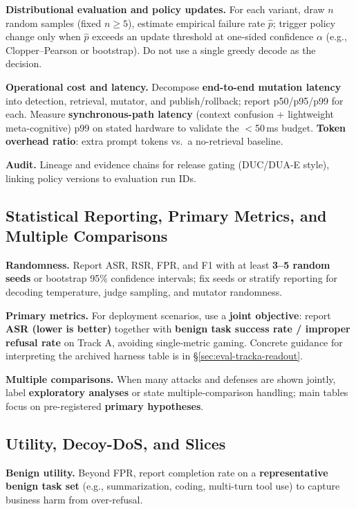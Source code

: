 \documentclass[letterpaper,twocolumn,10pt]{article}
\begin{document}
\textbf{Distributional evaluation and policy updates.} For each variant, draw $n$ random samples (fixed $n\ge 5$), estimate empirical failure rate $\hat{p}$; trigger policy change only when $\hat{p}$ exceeds an update threshold at one-sided confidence $\alpha$ (e.g., Clopper--Pearson or bootstrap). Do not use a single greedy decode as the decision.

\textbf{Operational cost and latency.} Decompose \textbf{end-to-end mutation latency} into detection, retrieval, mutator, and publish/rollback; report p50/p95/p99 for each. Measure \textbf{synchronous-path latency} (context confusion + lightweight meta-cognitive) p99 on stated hardware to validate the $<$50\,ms budget. \textbf{Token overhead ratio}: extra prompt tokens vs.\ a no-retrieval baseline.

\textbf{Audit.} Lineage and evidence chains for release gating (DUC/DUA-E style), linking policy versions to evaluation run IDs.

\subsection{Statistical Reporting, Primary Metrics, and Multiple Comparisons}
\label{sec:eval-stats}

\textbf{Randomness.} Report ASR, RSR, FPR, and F1 with at least \textbf{3--5 random seeds} or bootstrap 95\% confidence intervals; fix seeds or stratify reporting for decoding temperature, judge sampling, and mutator randomness.

\textbf{Primary metrics.} For deployment scenarios, use a \textbf{joint objective}: report \textbf{ASR (lower is better)} together with \textbf{benign task success rate / improper refusal rate} on Track A, avoiding single-metric gaming. Concrete guidance for interpreting the archived harness table is in \S\ref{sec:eval-tracka-readout}.

\textbf{Multiple comparisons.} When many attacks and defenses are shown jointly, label \textbf{exploratory analyses} or state multiple-comparison handling; main tables focus on pre-registered \textbf{primary hypotheses}.

\subsection{Utility, Decoy-DoS, and Slices}
\label{sec:eval-utility}

\textbf{Benign utility.} Beyond FPR, report completion rate on a \textbf{representative benign task set} (e.g., summarization, coding, multi-turn tool use) to capture business harm from over-refusal.
\end{document}
